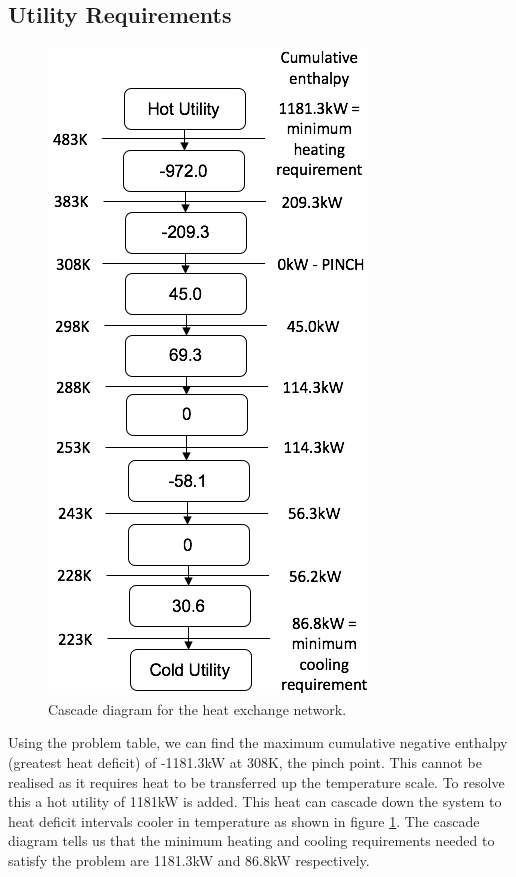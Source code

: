 \subsection{Utility Requirements} \label{ssec:utility}

\begin{figure}
\includegraphics[width=0.9\linewidth]{./pictures/cascadediagram2} 
\caption{Cascade diagram for the heat exchange network.}
\label{fig:cascade}
\end{figure}
Using the problem table, we can find the maximum cumulative negative enthalpy (greatest heat deficit) of -1181.3kW at 308K, the pinch point. This cannot be realised as it requires heat to be transferred up the temperature scale. To resolve this a hot utility of 1181kW is added. This heat can cascade down the system to heat deficit intervals cooler in temperature as shown in figure \ref{fig:cascade}. The cascade diagram tells us that the minimum heating and cooling requirements needed to satisfy the problem are 1181.3kW and 86.8kW respectively.

